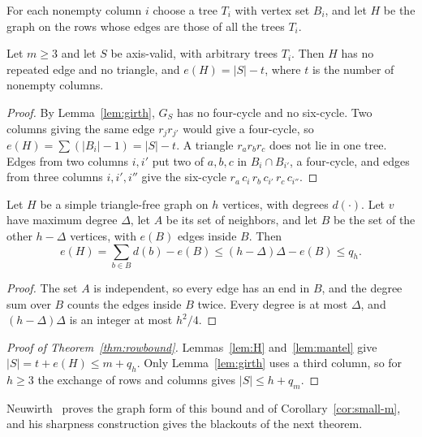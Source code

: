 For each nonempty column $i$ choose a tree $T_i$ with vertex set $B_i$, and let $H$ be the graph on the rows whose edges are those of all the trees $T_i$.

\begin{lemma}\label{lem:H}
Let $m\ge3$ and let $S$ be axis-valid, with arbitrary trees $T_i$. Then $H$ has no repeated edge and no triangle, and $e(H)=|S|-t$, where $t$ is the number of nonempty columns.
\end{lemma}

\begin{proof}
By Lemma~\ref{lem:girth}, $G_S$ has no four-cycle and no six-cycle. Two columns giving the same edge $r_jr_{j'}$ would give a four-cycle, so $e(H)=\sum(|B_i|-1)=|S|-t$. A triangle $r_ar_br_c$ does not lie in one tree. Edges from two columns $i,i'$ put two of $a,b,c$ in $B_i\cap B_{i'}$, a four-cycle, and edges from three columns $i,i',i''$ give the six-cycle $r_a\,c_i\,r_b\,c_{i'}\,r_c\,c_{i''}$.
\end{proof}

\begin{lemma}\label{lem:mantel}
Let $H$ be a simple triangle-free graph on $h$ vertices, with degrees $d(\cdot)$. Let $v$ have maximum degree $\Delta$, let $A$ be its set of neighbors, and let $B$ be the set of the other $h-\Delta$ vertices, with $e(B)$ edges inside $B$. Then
\[
e(H)=\sum_{b\in B}d(b)-e(B)\le(h-\Delta)\Delta-e(B)\le q_h.
\]
\end{lemma}

\begin{proof}
The set $A$ is independent, so every edge has an end in $B$, and the degree sum over $B$ counts the edges inside $B$ twice. Every degree is at most $\Delta$, and $(h-\Delta)\Delta$ is an integer at most $h^2/4$.
\end{proof}

\begin{proof}[Proof of Theorem~\ref{thm:rowbound}]
Lemmas~\ref{lem:H} and~\ref{lem:mantel} give $|S|=t+e(H)\le m+q_h$. Only Lemma~\ref{lem:girth} uses a third column, so for $h\ge3$ the exchange of rows and columns gives $|S|\le h+q_m$.
\end{proof}

Neuwirth~\cite[Theorem~1(ii), Proposition~17]{neuwirth2001} proves the graph form of this bound and of Corollary~\ref{cor:small-m}, and his sharpness construction gives the blackouts of the next theorem.

